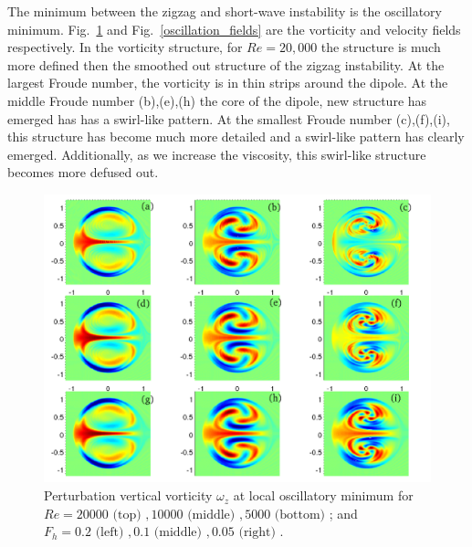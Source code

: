 The minimum between the zigzag and short-wave instability is the oscillatory minimum. Fig.~\ref{oscillation_vorticity} and Fig.~\ref{oscillation_fields} are the vorticity and velocity fields respectively. In the vorticity structure, for $Re=20{,}000$ the structure is much more defined then the smoothed out structure of the zigzag instability. At the largest Froude number, the vorticity is in thin strips around the dipole. At the middle Froude number (b),(e),(h) the core of the dipole, new structure has emerged has has a swirl-like pattern. At the smallest Froude number (c),(f),(i), this structure has become much more detailed and a swirl-like pattern has clearly emerged. Additionally, as we increase the viscosity, this swirl-like structure becomes more defused out. 
\begin{figure}
\begin{center}
\includegraphics[width=\textwidth]{vorticity_oscillation}
\caption{Perturbation vertical vorticity $\omega_{z}$ at local oscillatory minimum for $Re=20000\text{ (top) }, 10000 \text{ (middle) }, 5000 \text{ (bottom) }$; and $F_{h}=0.2 \text{ (left) }, 0.1 \text{ (middle) }, 0.05 \text{ (right) }$.}
\label{oscillation_vorticity}
\end{center}
\end{figure} 
